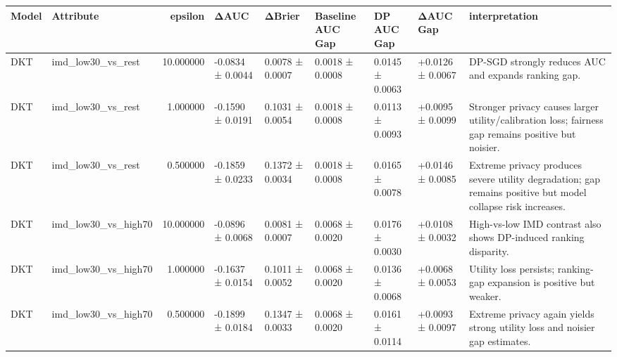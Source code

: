 \begin{tabular}{llrllllll}
\toprule
Model & Attribute & epsilon & ΔAUC & ΔBrier & Baseline AUC Gap & DP AUC Gap & ΔAUC Gap & interpretation \\
\midrule
DKT & imd_low30_vs_rest & 10.000000 & -0.0834 ± 0.0044 & 0.0078 ± 0.0007 & 0.0018 ± 0.0008 & 0.0145 ± 0.0063 & +0.0126 ± 0.0067 & DP-SGD strongly reduces AUC and expands ranking gap. \\
DKT & imd_low30_vs_rest & 1.000000 & -0.1590 ± 0.0191 & 0.1031 ± 0.0054 & 0.0018 ± 0.0008 & 0.0113 ± 0.0093 & +0.0095 ± 0.0099 & Stronger privacy causes larger utility/calibration loss; fairness gap remains positive but noisier. \\
DKT & imd_low30_vs_rest & 0.500000 & -0.1859 ± 0.0233 & 0.1372 ± 0.0034 & 0.0018 ± 0.0008 & 0.0165 ± 0.0078 & +0.0146 ± 0.0085 & Extreme privacy produces severe utility degradation; gap remains positive but model collapse risk increases. \\
DKT & imd_low30_vs_high70 & 10.000000 & -0.0896 ± 0.0068 & 0.0081 ± 0.0007 & 0.0068 ± 0.0020 & 0.0176 ± 0.0030 & +0.0108 ± 0.0032 & High-vs-low IMD contrast also shows DP-induced ranking disparity. \\
DKT & imd_low30_vs_high70 & 1.000000 & -0.1637 ± 0.0154 & 0.1011 ± 0.0052 & 0.0068 ± 0.0020 & 0.0136 ± 0.0068 & +0.0068 ± 0.0053 & Utility loss persists; ranking-gap expansion is positive but weaker. \\
DKT & imd_low30_vs_high70 & 0.500000 & -0.1899 ± 0.0184 & 0.1347 ± 0.0033 & 0.0068 ± 0.0020 & 0.0161 ± 0.0114 & +0.0093 ± 0.0097 & Extreme privacy again yields strong utility loss and noisier gap estimates. \\
\bottomrule
\end{tabular}
